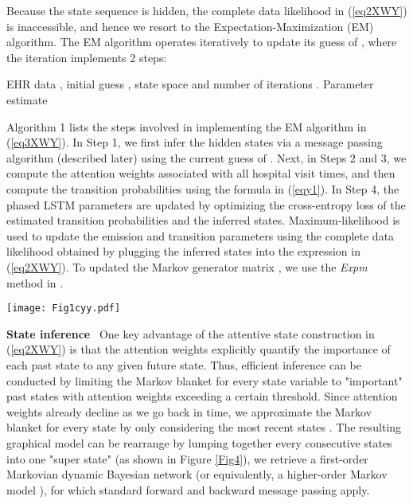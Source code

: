 \documentclass[twoside,11pt]{article}
\begin{document}
Because the state sequence \mbox{\footnotesize } is hidden, the complete data likelihood in (\ref{eq2XWY}) is inaccessible, and hence we resort to the Expectation-Maximization (EM) algorithm. The EM algorithm operates iteratively to update its guess of \mbox{\footnotesize }, where the  iteration implements 2 steps: 

\begin{algorithm*}[t]
\caption{EM algorithm for learning the PASS model parameters}
\begin{algorithmic} 
 EHR data , initial guess , state space  and number of iterations .
 Parameter estimate  
\WHILE{}
 \,\, 
 \,\, 
 \,\, 
 \,\, 
 \,\, 
 \,\, 
 \,\, 
\ENDWHILE
\label{alg1}
\end{algorithmic}
\end{algorithm*}
Algorithm 1 lists the steps involved in implementing the EM algorithm in (\ref{eq3XWY}). In Step 1, we first infer the hidden states via a message passing algorithm (described later) using the current guess of \mbox{\footnotesize }. Next, in Steps 2 and 3, we compute the attention weights associated with all hospital visit times, and then compute the transition probabilities using the formula in (\ref{eqy1}). In Step 4, the phased LSTM parameters are updated by optimizing the cross-entropy loss of the estimated transition probabilities and the inferred states. Maximum-likelihood is used to update the emission and transition parameters using the complete data likelihood obtained by plugging the inferred states into the expression in (\ref{eq2XWY}). To updated the Markov generator matrix \mbox{\footnotesize }, we use the {\it Expm} method in \cite{liu2015efficient}.  

\begin{figure*}[t]
  \centering
  \texttt{[image: Fig1cyy.pdf]}
	\label{Fig4}
\end{figure*}

{\bf State inference}\,\,\, One key advantage of the attentive state construction in (\ref{eq2XWY}) is that the attention weights explicitly quantify the importance of each past state to any given future state. Thus, efficient inference can be conducted by limiting the Markov blanket for every state variable to "important" past states with attention weights exceeding a certain threshold. Since attention weights already decline as we go back in time, we approximate the Markov blanket for every state  by only considering the  most recent states . The resulting graphical model can be rearrange by lumping together every  consecutive states into one "super state" (as shown in Figure \ref{Fig4}), we retrieve a first-order Markovian dynamic Bayesian network (or equivalently, a higher-order Markov model \cite{murphy2002dynamic}), for which standard forward and backward message passing apply.   
\end{document}
